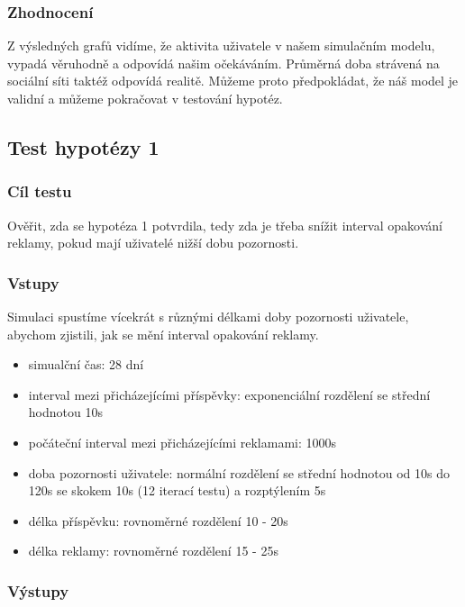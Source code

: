 \documentclass[11pt, a4paper]{article}
\begin{document}
\subsubsection{Zhodnocení}
Z výsledných grafů vidíme, že aktivita uživatele v našem simulačním modelu, vypadá věruhodně a odpovídá našim očekáváním.
Průměrná doba strávená na sociální síti taktéž odpovídá realitě. Můžeme proto předpokládat, že náš model je validní a můžeme pokračovat v testování hypotéz.

\newpage

\subsection{Test hypotézy 1}

\subsubsection{Cíl testu}
Ověřit, zda se hypotéza 1 potvrdila, tedy zda je třeba snížit interval opakování reklamy, pokud mají uživatelé nižší dobu pozornosti.
\subsubsection{Vstupy}
Simulaci spustíme vícekrát s různými délkami doby pozornosti uživatele, abychom zjistili, jak se mění interval opakování reklamy.
\begin{itemize}
    \item simualční čas: 28 dní
    \item interval mezi přicházejícími příspěvky: exponenciální rozdělení se střední hodnotou 10s
    \item počáteční interval mezi přicházejícími reklamami: 1000s
    \item doba pozornosti uživatele: normální rozdělení se střední hodnotou od 10s do 120s se skokem 10s (12 iterací testu) a rozptýlením 5s
    \item délka příspěvku: rovnoměrné rozdělení 10 - 20s
    \item délka reklamy: rovnoměrné rozdělení 15 - 25s
\end{itemize}

\subsubsection{Výstupy}
\end{document}
